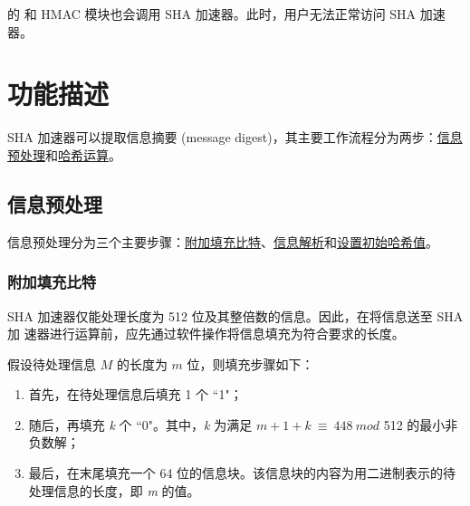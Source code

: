 \documentclass[main\_\_CN.tex]{subfiles}
\begin{document}
\begin{importantlisting}
\vspace{-0.5em}

    \chipname{} 的  和 HMAC 模块也会调用 SHA 加速器。此时，用户无法正常访问 SHA 加速器。
\end{importantlisting}

\section{功能描述}

SHA 加速器可以提取信息摘要 (message digest)，其主要工作流程分为两步：\hyperref[sec:sha-preprocessing]{信息预处理}和\hyperref[sec:sha-hash-operation]{哈希运算}。

\subsection{信息预处理}\label{sec:sha-preprocessing}

信息预处理分为三个主要步骤：\hyperref[sec:sha-textpadding]{附加填充比特}、\hyperref[sec:sha-parsingmessage]{信息解析}和\hyperref[sec:sha-initialhash]{设置初始哈希值}。

\subsubsection{附加填充比特}\label{sec:sha-textpadding}

SHA 加速器仅能处理长度为 512 位及其整倍数的信息。因此，在将信息送至 SHA 加
速器进行运算前，应先通过软件操作将信息填充为符合要求的长度。

假设待处理信息 \begin{math} M \end{math} 的长度为 \begin{math} m \end{math} 位，则填充步骤如下：

\begin{enumerate}
    \item 首先，在待处理信息后填充 1 个 ``1"；
    \item 随后，再填充 {\it{k}} 个 ``0"。其中，{\it{k}} 为满足 \begin{math}m + 1 + k \ {\equiv} \ 448 \ mod \end{math} 512 的最小非负数解；
    \item 最后，在末尾填充一个 64 位的信息块。该信息块的内容为用二进制表示的待处理信息的长度，即 {\it{m}} 的值。
\end{enumerate}
\end{document}
